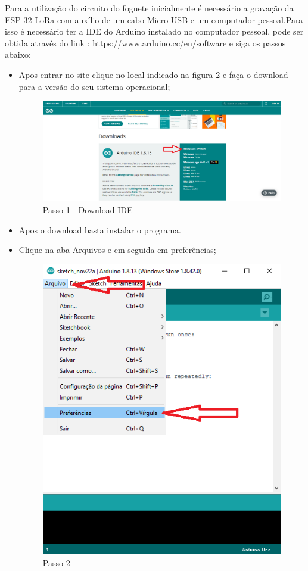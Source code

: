 \par Para a utilização do circuito do foguete inicialmente é necessário a gravação da ESP 32 LoRa com auxílio de um cabo Micro-USB e um computador pessoal.Para isso é necessário ter a IDE do Arduíno instalado no computador pessoal, pode ser obtida através do link : https://www.arduino.cc/en/software e siga os passos abaixo:
\begin{itemize}
    \item Apos entrar no site clique no local indicado na figura \ref{fig:Download ide} e faça o download para a versão do seu sistema operacional;
    \begin{figure}[H]
  \centering
  \includegraphics[scale=0.4]{Figuras/passo1.png}
  \caption{Passo 1 - Download IDE}
  \label{fig:Download ide}
\end{figure}
\item Apos o download basta instalar o programa.
\item Clique na aba Arquivos e em seguida em preferências;
   \begin{figure}[H]
  \centering
  \includegraphics[scale=0.4]{Figuras/passo2.png}
  \caption{Passo 2}
  \label{fig:Download ide}
\end{figure}


\end{itemize}
